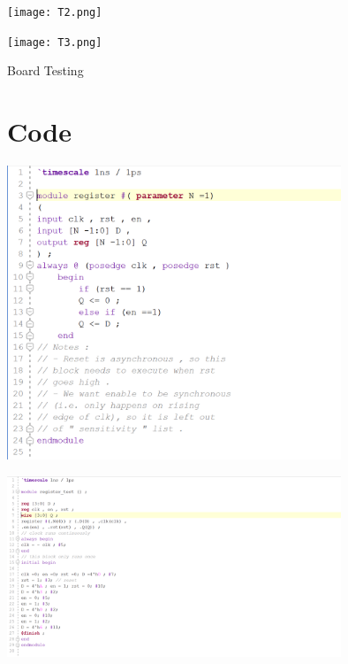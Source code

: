 \documentclass[]{report}
\begin{document}
	\begin{center}\texttt{[image: T2.png]}\end{center}
	
	\begin{center}\texttt{[image: T3.png]}\end{center}
	
	\begin{center}
		
		Board Testing 
		
	\end{center}
	
	
	
	
	\clearpage
	\section*{Code}
	
	\begin{center}\includegraphics[width=0.75\textwidth]{Register.png}\end{center}
	
	\begin{center}\includegraphics[width=0.75\textwidth]{regTest.png}\end{center}
	
\end{document}
